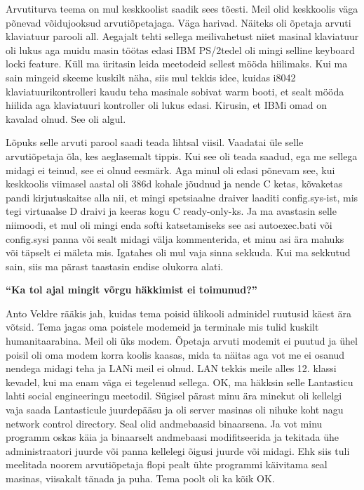 Arvutiturva teema on mul keskkoolist saadik sees tõesti. Meil olid keskkoolis väga põnevad võidujooksud arvutiõpetajaga. Väga harivad. Näiteks oli õpetaja arvuti klaviatuur parooli all. Aegajalt tehti sellega meilivahetust niiet masinal klaviatuur oli lukus aga muidu masin töötas edasi IBM PS/2tedel oli mingi selline keyboard locki feature. Küll ma üritasin leida meetodeid sellest mööda hiilimaks. Kui ma sain mingeid skeeme kuskilt näha, siis mul tekkis idee, kuidas i8042 klaviatuurikontrolleri kaudu teha masinale sobivat warm booti, et sealt mööda hiilida aga klaviatuuri kontroller oli lukus edasi. Kirusin, et IBMi omad on kavalad olnud. See oli algul. 

Lõpuks selle arvuti parool saadi teada lihtsal viisil. Vaadatai üle selle arvutiõpetaja õla, kes aeglasemalt tippis. Kui see oli teada saadud, ega me sellega midagi ei teinud, see ei olnud eesmärk. Aga minul oli edasi põnevam see, kui keskkoolis viimasel aastal oli 386d kohale jõudnud ja nende C ketas, kõvaketas pandi kirjutuskaitse alla nii, et mingi spetsiaalne draiver laaditi config.sys-ist, mis tegi virtuaalse D draivi ja keeras kogu C ready-only-ks. Ja ma avastasin selle niimoodi, et mul oli mingi enda softi katsetamiseks see asi autoexec.bati või config.sysi panna või sealt midagi välja kommenterida, et minu asi ära mahuks või täpselt ei mäleta mis. Igatahes oli mul vaja sinna sekkuda. Kui ma sekkutud sain, siis ma pärast taastasin endise olukorra alati. 

\textbf{\enquote{Ka tol ajal mingit võrgu häkkimist ei toimunud?}}

Anto Veldre rääkis jah, kuidas tema poisid ülikooli adminidel ruutusid käest ära võtsid. Tema jagas oma poistele modemeid ja terminale mis tulid kuskilt humanitaarabina. Meil oli üks modem. Õpetaja arvuti modemit ei puutud ja ühel poisil oli oma modem korra koolis kaasas, mida ta näitas aga vot me ei osanud nendega midagi teha ja LANi meil ei olnud. LAN tekkis meile alles 12. klassi kevadel, kui ma enam väga ei tegelenud sellega. OK, ma häkksin selle Lantasticu lahti social engineeringu meetodil. Sügisel pärast minu ära minekut oli kellelgi vaja saada Lantasticule juurdepääsu ja oli server masinas oli nihuke koht nagu network control directory. Seal olid andmebaasid binaarsena. Ja vot minu programm oskas käia ja binaarselt andmebaasi modifitseerida ja tekitada ühe administraatori juurde või panna kellelegi õigusi juurde või midagi. Ehk siis tuli meelitada noorem arvutiõpetaja flopi pealt ühte programmi käivitama seal masinas, viisakalt tänada ja puha. Tema poolt oli ka kõik OK. 

